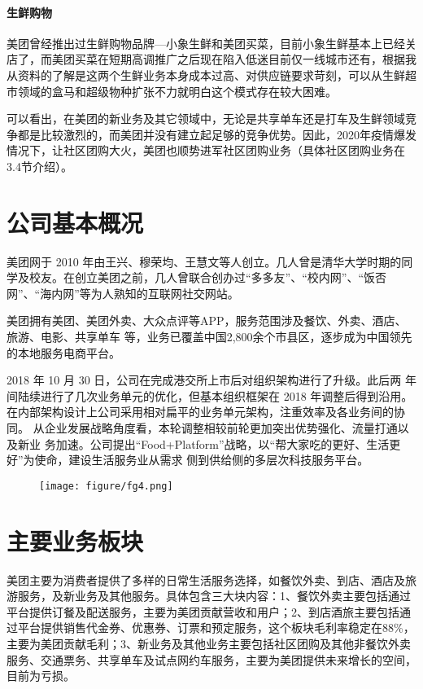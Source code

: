 \documentclass[UTF8,a4paper,12pt,lang=cn,fontset = windows]{elegantpaper} %
\begin{document}
\paragraph{生鲜购物} 美团曾经推出过生鲜购物品牌—小象生鲜和美团买菜，目前小象生鲜基本上已经关店了，而美团买菜在短期高调推广之后现在陷入低迷目前仅一线城市还有，根据我从资料的了解是这两个生鲜业务本身成本过高、对供应链要求苛刻，可以从生鲜超市领域的盒马和超级物种扩张不力就明白这个模式存在较大困难。

可以看出，在美团的新业务及其它领域中，无论是共享单车还是打车及生鲜领域竞争都是比较激烈的，而美团并没有建立起足够的竞争优势。因此，2020年疫情爆发情况下，让社区团购大火，美团也顺势进军社区团购业务（具体社区团购业务在3.4节介绍）。
\section{公司基本概况}
美团网于 2010 年由王兴、穆荣均、王慧文等人创立。几人曾是清华大学时期的同学及校友。在创立美团之前，几人曾联合创办过“多多友”、“校内网”、“饭否网”、“海内网”等为人熟知的互联网社交网站。

美团拥有美团、美团外卖、大众点评等APP，服务范围涉及餐饮、外卖、酒店、旅游、电影、共享单车
等，业务已覆盖中国2,800余个市县区，逐步成为中国领先的本地服务电商平台。

2018 年 10 月 30 日，公司在完成港交所上市后对组织架构进行了升级。此后两
年间陆续进行了几次业务单元的优化，但基本组织框架在 2018 年调整后得到沿用。
在内部架构设计上公司采用相对扁平的业务单元架构，注重效率及各业务间的协同。
从企业发展战略角度看，本轮调整相较前轮更加突出优势强化、流量打通以及新业
务加速。公司提出“Food+Platform”战略，以“帮大家吃的更好、生活更好”为使命，建设生活服务业从需求
侧到供给侧的多层次科技服务平台。

\begin{figure}[htbp]
  \small
  \centering
  \texttt{[image: figure/fg4.png]}
  \end{figure}
\newpage
\section{主要业务板块}
美团主要为消费者提供了多样的日常生活服务选择，如餐饮外卖、到店、酒店及旅游服务，及新业务及其他服务。具体包含三大块内容：1、餐饮外卖主要包括通过平台提供订餐及配送服务，主要为美团贡献营收和用户；2、到店酒旅主要包括通过平台提供销售代金券、优惠券、订票和预定服务，这个板块毛利率稳定在88\%，主要为美团贡献毛利；3、新业务及其他业务主要包括社区团购及其他非餐饮外卖服务、交通票务、共享单车及试点网约车服务，主要为美团提供未来增长的空间，目前为亏损。
\end{document}
